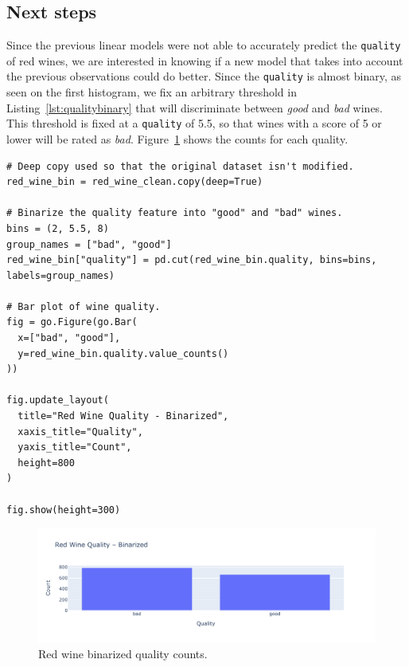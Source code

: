 \documentclass[12pt]{article}
\begin{document}
  \subsection{Next steps}

  Since the previous linear models were not able to accurately predict the
  \lstinline{quality} of red wines, we are interested in knowing if a new model
  that takes into account the previous observations could do better. Since the
  \lstinline{quality} is almost binary, as seen on the first histogram, we fix
  an arbitrary threshold in Listing~\ref{lst:qualitybinary} that will
  discriminate between \textit{good} and \textit{bad} wines.  This threshold is
  fixed at a \lstinline{quality} of 5.5, so that wines with a score of 5 or
  lower will be rated as \textit{bad}. Figure~\ref{fig:qualitybinary} shows the
  counts for each quality.

  \begin{lstlisting}[caption={Binarize the quality feature.}, captionpos=b,
    label={lst:qualitybinary}]
# Deep copy used so that the original dataset isn't modified.
red_wine_bin = red_wine_clean.copy(deep=True)

# Binarize the quality feature into "good" and "bad" wines.
bins = (2, 5.5, 8)
group_names = ["bad", "good"]
red_wine_bin["quality"] = pd.cut(red_wine_bin.quality, bins=bins, labels=group_names)

# Bar plot of wine quality.
fig = go.Figure(go.Bar(
  x=["bad", "good"],
  y=red_wine_bin.quality.value_counts()
))

fig.update_layout(
  title="Red Wine Quality - Binarized",
  xaxis_title="Quality",
  yaxis_title="Count",
  height=800
)

fig.show(height=300)
  \end{lstlisting}

  \begin{figure}[!ht]
    \centering
    \includegraphics[width=\textwidth]{figures/qualitybinary}
    \caption{Red wine binarized quality counts.}%
    \label{fig:qualitybinary}
  \end{figure} 
\end{document}
